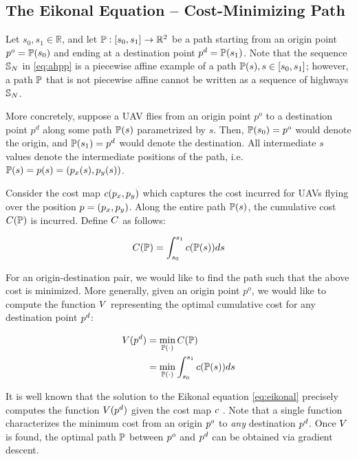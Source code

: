 \subsection{The Eikonal Equation -- Cost-Minimizing Path}
Let $s_0, s_1\in \mathbb{R}$, and let $\mathbb{P}: [s_0, s_1] \rightarrow \mathbb{R}^2$ be a path starting from an origin point $p^o = \mathbb{P}(s_0)$ and ending at a destination point $p^d = \mathbb{P}(s_1)$. Note that the sequence $\mathbb{S}_N$ in \eqref{eq:ahpp} is a piecewise affine example of a path $\mathbb{P}(s), s\in[s_0, s_1]$; however, a path $\mathbb{P}$ that is not piecewise affine cannot be written as a sequence of highways $\mathbb{S}_N$.

More concretely, suppose a UAV flies from an origin point $p^o$ to a destination point $p^d$ along some path $\mathbb{P}(s)$ parametrized by $s$. Then, $\mathbb{P}(s_0) = p^o$ would denote the origin, and $\mathbb{P}(s_1) = p^d$ would denote the destination. All intermediate $s$ values denote the intermediate positions of the path, i.e. $\mathbb{P}(s) = p(s) = (p_x(s), p_y(s))$.

Consider the cost map $c(p_x, p_y)$ which captures the cost incurred for UAVs flying over the position $p = (p_x, p_y)$. Along the entire path $\mathbb{P}(s)$, the cumulative cost $C(\mathbb{P})$ is incurred. Define $C$ as follows:

\begin{equation}
C(\mathbb{P}) = \int_{s_0}^{s_1} c(\mathbb{P}(s)) ds
\end{equation}

For an origin-destination pair, we would like to find the path such that the above cost is minimized. More generally, given an origin point $p^o$, we would like to compute the function $V$ representing the optimal cumulative cost for any destination point $p^d$:

\begin{equation}
\label{eq:rahpp} %
\begin{aligned}
\ocost(\pos^d) &= \min_{\ppath(\cdot)} \ccost(\ppath) \\
&= \min_{\ppath(\cdot)} \int_{s_0}^{s_1} \cmap(\ppath(s)) ds
\end{aligned}
\end{equation}

It is well known that the solution to the Eikonal equation \eqref{eq:eikonal} precisely computes the function $V(p^d)$ given the cost map $c$ \cite{Sethian96,Alton06}. Note that a single function characterizes the minimum cost from an origin $p^o$ to \textit{any} destination $p^d$. Once $V$ is found, the optimal path $\mathbb{P}$ between $p^o$ and $p^d$ can be obtained via gradient descent.

